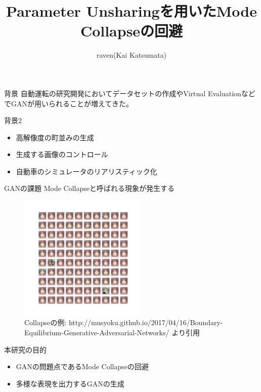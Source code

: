 \documentclass[dvipdfmx,12pt,unicode]{beamer}
\title{Parameter Unsharingを用いたMode Collapseの回避}
\author{raven(Kai Katsumata)}
\institute[JPN]{SL B2 \\ 親 ryoga}
\begin{document}
\begin{frame}\frametitle{}
  \maketitle
\end{frame}

\begin{frame}{背景}
  自動運転の研究開発においてデータセットの作成やVirtual EvaluationなどでGAN\cite{gan}が用いられることが増えてきた。
\end{frame}

\begin{frame}{背景2}
  \begin{itemize}
  \item 高解像度の町並みの生成\cite{pix2pixhd}
  \item 生成する画像のコントロール\cite{pix2pixhd}
  \item 自動車のシミュレータのリアリスティック化\cite{simgan}
  \end{itemize}
\end{frame}

\begin{frame}{GANの課題}
  Mode Collapseと呼ばれる現象が発生する
  \begin{figure}[htb]
    \centering
    \includegraphics[height=6cm]{collapse.png}
    \vspace*{-1cm}    
    \caption{Collapseの例: {\scriptsize http://musyoku.github.io/2017/04/16/Boundary-Equilibrium-Generative-Adversarial-Networks/ より引用} \label{fig:collapse}}
  \end{figure}  
\end{frame}

\begin{frame}{本研究の目的}
  \begin{itemize}
  \item GANの問題点であるMode Collapseの回避
  \item 多様な表現を出力するGANの生成
  \end{itemize}
\end{frame}
\end{document}
